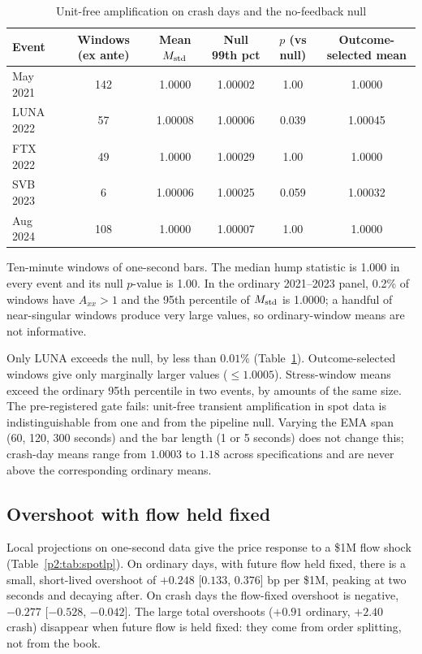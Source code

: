 \begin{table}[t]\centering\small
\begin{threeparttable}
\caption{Unit-free amplification on crash days and the no-feedback null}\label{p2:tab:spotnull}
\begin{tabular}{lccccc}
\toprule
Event & Windows (ex ante) & Mean $M_{\rm std}$ & Null 99th pct & $p$ (vs null) & Outcome-selected mean\\
\midrule
May 2021 & 142 & 1.0000 & 1.00002 & 1.00 & 1.0000\\
LUNA 2022 & 57 & 1.00008 & 1.00006 & 0.039 & 1.00045\\
FTX 2022 & 49 & 1.0000 & 1.00029 & 1.00 & 1.0000\\
SVB 2023 & 6 & 1.00006 & 1.00025 & 0.059 & 1.00032\\
Aug 2024 & 108 & 1.0000 & 1.00007 & 1.00 & 1.0000\\
\bottomrule
\end{tabular}
\begin{tablenotes}\footnotesize\item Ten-minute windows of one-second bars. The median hump statistic is 1.000 in every event and its null $p$-value is 1.00. In the ordinary 2021--2023 panel, 0.2\% of windows have $A_{xx}>1$ and the 95th percentile of $M_{\rm std}$ is 1.0000; a handful of near-singular windows produce very large values, so ordinary-window means are not informative. \end{tablenotes}
\end{threeparttable}
\end{table}

Only LUNA exceeds the null, by less than $0.01\%$ (Table~\ref{p2:tab:spotnull}). Outcome-selected windows give only marginally larger values ($\le1.0005$). Stress-window means exceed the ordinary 95th percentile in two events, by amounts of the same size. The pre-registered gate fails: unit-free transient amplification in spot data is indistinguishable from one and from the pipeline null. Varying the EMA span (60, 120, 300 seconds) and the bar length (1 or 5 seconds) does not change this; crash-day means range from $1.0003$ to $1.18$ across specifications and are never above the corresponding ordinary means.

\subsection{Overshoot with flow held fixed}
Local projections on one-second data give the price response to a \$1M flow shock (Table~\ref{p2:tab:spotlp}). On ordinary days, with future flow held fixed, there is a small, short-lived overshoot of $+0.248$ [$0.133$, $0.376$] bp per \$1M, peaking at two seconds and decaying after. On crash days the flow-fixed overshoot is negative, $-0.277$ [$-0.528$, $-0.042$]. The large total overshoots ($+0.91$ ordinary, $+2.40$ crash) disappear when future flow is held fixed: they come from order splitting, not from the book.

